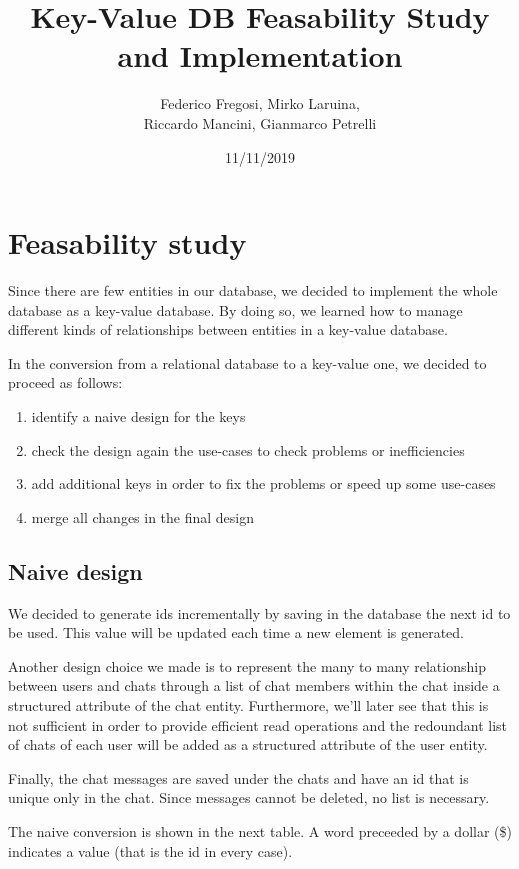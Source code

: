 \documentclass[10pt]{article}
\title{Key-Value DB Feasability Study and Implementation}
\date{11/11/2019}
\author{Federico Fregosi, Mirko Laruina,\\
        Riccardo Mancini, Gianmarco Petrelli}
\begin{document}
\maketitle
\vfill
\setcounter{tocdepth}{2}
\tableofcontents
\vfill
\clearpage
\setcounter{page}{1}

\section{Feasability study}

Since there are few entities in our database, we decided to implement the whole 
database as a key-value database. By doing so, we learned how to manage different
kinds of relationships between entities in a key-value database.

In the conversion from a relational database to a key-value one, we decided to 
proceed as follows:
\begin{enumerate}
    \item identify a naive design for the keys
    \item check the design again the use-cases to check problems or 
        inefficiencies
    \item add additional keys in order to fix the problems or speed up some use-cases
    \item merge all changes in the final design
\end{enumerate}

\subsection{Naive design}
We decided to generate ids incrementally by saving in the database the next id
to be used. This value will be updated each time a new element is generated.

Another design choice we made is to represent the many to many relationship 
between users and chats through a list of chat members within the chat inside 
a structured attribute of the chat entity. 
Furthermore, we'll later see that this is not sufficient in order to provide 
efficient read operations and the redoundant list of chats of each user will 
be added as a structured attribute of the user entity.

Finally, the chat messages are saved under the chats and have an id that is 
unique only in the chat. Since messages cannot be deleted, no list is necessary.

The naive conversion is shown in the next table. A word preceeded by a dollar 
(\$) indicates a value (that is the id in every case).
\end{document}

